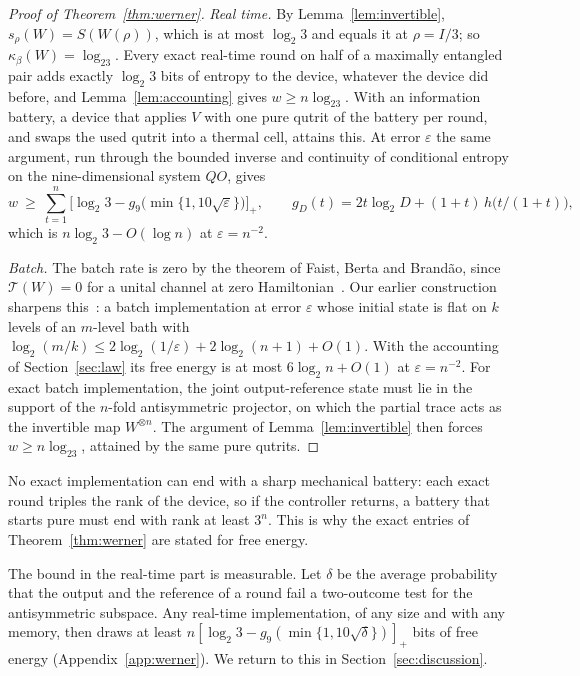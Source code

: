 \documentclass[11pt]{article}
\theoremstyle{definition}
\theoremstyle{remark}
\newcommand{\Tcap}{\mathcal T}
\newcommand{\Trt}{\kappa_\beta}
\begin{document}
\begin{proof}[Proof of Theorem~\ref{thm:werner}]
\emph{Real time.} By Lemma~\ref{lem:invertible}, $s_\rho(W)=S(W(\rho))$, which is at most $\log_2 3$ and equals it at $\rho=I/3$; so $\Trt(W)=\log_23$. Every exact real-time round on half of a maximally entangled pair adds exactly $\log_2 3$ bits of entropy to the device, whatever the device did before, and Lemma~\ref{lem:accounting} gives $w\ge n\log_23$. With an information battery, a device that applies $V$ with one pure qutrit of the battery per round, and swaps the used qutrit into a thermal cell, attains this. At error $\varepsilon$ the same argument, run through the bounded inverse and continuity of conditional entropy on the nine-dimensional system $QO$, gives
\[
w\ \ge\ \sum_{t=1}^n\bigl[\log_2 3-g_9\bigl(\min\{1,10\sqrt{\varepsilon}\}\bigr)\bigr]_+,\qquad g_D(t)=2t\log_2 D+(1+t)\,h\bigl(t/(1+t)\bigr),
\]
which is $n\log_2 3-O(\log n)$ at $\varepsilon=n^{-2}$.

\emph{Batch.} The batch rate is zero by the theorem of Faist, Berta and Brand\~ao, since $\Tcap(W)=0$ for a unital channel at zero Hamiltonian~\cite{FBB21}. Our earlier construction sharpens this~\cite{ImmediateDelivery}: a batch implementation at error $\varepsilon$ whose initial state is flat on $k$ levels of an $m$-level bath with $\log_2(m/k)\le2\log_2(1/\varepsilon)+2\log_2(n+1)+O(1)$. With the accounting of Section~\ref{sec:law} its free energy is at most $6\log_2 n+O(1)$ at $\varepsilon=n^{-2}$. For exact batch implementation, the joint output-reference state must lie in the support of the $n$-fold antisymmetric projector, on which the partial trace acts as the invertible map $W^{\otimes n}$. The argument of Lemma~\ref{lem:invertible} then forces $w\ge n\log_23$, attained by the same pure qutrits.
\end{proof}

No exact implementation can end with a sharp mechanical battery: each exact round triples the rank of the device, so if the controller returns, a battery that starts pure must end with rank at least $3^n$. This is why the exact entries of Theorem~\ref{thm:werner} are stated for free energy.

The bound in the real-time part is measurable. Let $\delta$ be the average probability that the output and the reference of a round fail a two-outcome test for the antisymmetric subspace. Any real-time implementation, of any size and with any memory, then draws at least $n[\log_2 3-g_9(\min\{1,10\sqrt{\delta}\})]_+$ bits of free energy (Appendix~\ref{app:werner}). We return to this in Section~\ref{sec:discussion}.
\end{document}
